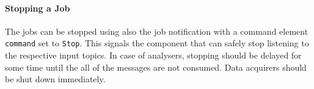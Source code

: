 \paragraph{Stopping a Job}

The jobs can be stopped using also the job notification with a command element \texttt{command} set to \texttt{Stop}. This signals the component that can safely stop listening to the respective input topics. In case of analysers, stopping should be delayed for some time until the all of the messages are not consumed. Data acquirers should be shut down immediately.
